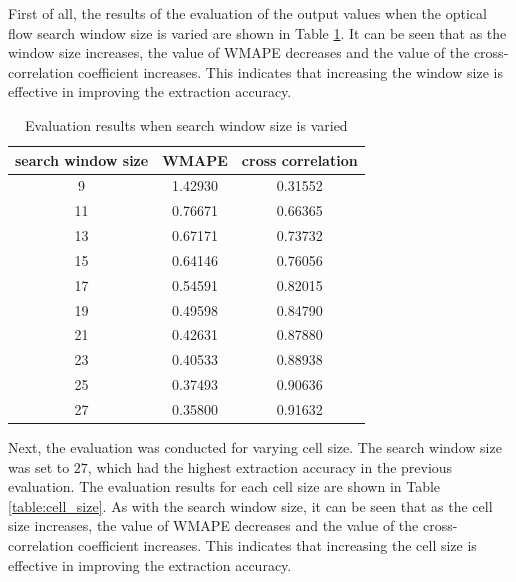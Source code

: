 First of all, the results of the evaluation of the output values when the optical flow search window size is
varied are shown in Table \ref{table:window_size}.
It can be seen that as the window size increases,
the value of WMAPE decreases and the value of the cross-correlation coefficient increases.
This indicates that increasing the window size is effective in improving the extraction accuracy.


\begin{table}[tb]
  \centering
  \caption{Evaluation results when search window size is varied}
  \label{table:window_size}
  \begin{tabular}{|c|c|c|}
    \hline
    search window size   & WMAPE &cross correlation  \\ \hline \hline
    9         &1.42930  &0.31552       \\ \hline
    11        &0.76671  &0.66365 \\ \hline
    13        &0.67171  &0.73732 \\ \hline
    15        &0.64146  &0.76056  \\ \hline
    17        &0.54591  &0.82015  \\ \hline
    19        &0.49598  &0.84790   \\ \hline
    21        &0.42631  &0.87880  \\ \hline
    23        &0.40533  &0.88938   \\ \hline
    25        &0.37493  &0.90636  \\ \hline
    27        &0.35800  &0.91632   \\ \hline
  \end{tabular}
\end{table}






Next, the evaluation was conducted for varying cell size.
The search window size was set to $27$, which had the highest extraction accuracy in the previous evaluation.
The evaluation results for each cell size are shown in Table \ref{table:cell_size}.
As with the search window size, it can be seen that as the cell size increases,
the value of WMAPE decreases and the value of the cross-correlation coefficient increases.
This indicates that increasing the cell size is effective in improving the extraction accuracy.


